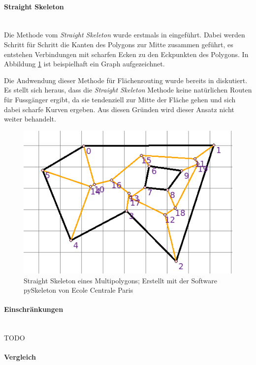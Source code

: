 \paragraph{Straight Skeleton}~\\

Die Methode vom \emph{Straight Skeleton} wurde erstmals in \cite{aichholzer_skeleton} eingeführt. Dabei werden Schritt für Schritt die Kanten des Polygons zur Mitte zusammen geführt, es entstehen Verbindungen mit scharfen Ecken zu den Eckpunkten des Polygons. In Abbildung \ref{fig:skeleton_example} ist beispielhaft ein Graph aufgezeichnet.

Die Andwendung dieser Methode für Flächenrouting wurde bereits in \cite{graser_visibility_graph} diskutiert. Es stellt sich heraus, dass die \emph{Straight Skeleton} Methode keine natürlichen Routen für Fussgänger ergibt, da sie tendenziell zur Mitte der Fläche gehen und sich dabei scharfe Kurven ergeben. Aus diesen Gründen wird dieser Ansatz nicht weiter behandelt.

\begin{figure}[th]
\centering
\includegraphics[width=0.7\linewidth]{technicalreport/img/skeleton_example.png}
\caption[Straight Skeleton Beispiel]{Straight Skeleton eines Multipolygons; Erstellt mit der Software pySkeleton von Ecole Centrale Paris}
\label{fig:skeleton_example}
\end{figure}

\paragraph{Einschränkungen}~\\

TODO

\paragraph{Vergleich}~\\

